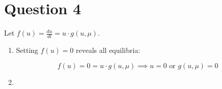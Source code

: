 \documentclass[12pt,a4paper]{article}
\begin{document}
\section{Question 4}

Let $f(u) = \frac{du}{dt} = u\cdot g(u, \mu)$.

\begin{enumerate}[label=(\roman*)]
\item
Setting $f(u) = 0$ reveals all equilibria:

$$f(u) = 0 = u\cdot g(u, \mu) \implies u = 0 \text{ or } g(u, \mu) = 0$$
\item 
\end{enumerate}
\end{document}
